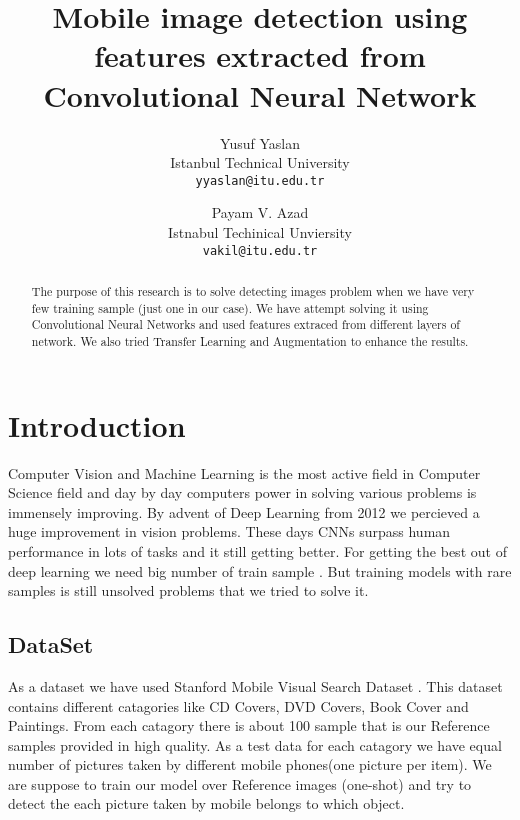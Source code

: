 \documentclass[10pt,twocolumn,letterpaper]{article}
\begin{document}
\title{Mobile image detection using features extracted from Convolutional Neural Network}

\author{Yusuf Yaslan\\
Istanbul Technical University\\
{\tt\small yyaslan@itu.edu.tr}
\and
Payam V. Azad\\
Istnabul Techinical Unviersity\\
{\tt\small vakil@itu.edu.tr}
}

\maketitle


\begin{abstract}
The purpose of this research is to solve detecting images problem when we have very few training sample (just one in our case). We have attempt solving it using Convolutional Neural Networks and used features extraced from different layers of network. We also tried  Transfer Learning and Augmentation to enhance the results.
\end{abstract}

\section{Introduction}
Computer Vision and Machine Learning is the most active field in Computer Science field and day by day computers power in solving various problems is immensely improving. By advent of Deep Learning from 2012 \cite{alexnet} we percieved a huge improvement in vision problems. These days CNNs surpass human performance in lots of tasks and it still getting better. For getting the best out of deep learning we need big number of train sample \cite{oneshotlearning1}. But training models with rare samples is still unsolved problems that we tried to solve it. 

\subsection{DataSet}
As a dataset we have used Stanford Mobile Visual Search Dataset \cite{stanfordmobileimages}. This dataset contains different catagories like CD Covers, DVD Covers, Book Cover and Paintings. From each catagory there is about 100 sample that is our Reference samples provided in high quality. As a test data for each catagory we have equal number of pictures taken by different mobile phones(one picture per item). We are suppose to train our model over Reference images (one-shot) and try to detect the each picture taken by mobile belongs to which object. 
\end{document}

